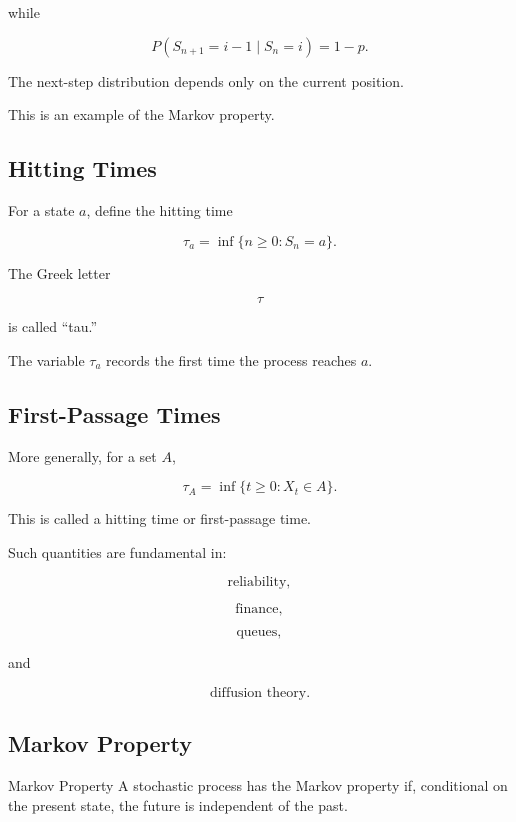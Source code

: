 while

\[
P(S_{n+1}=i-1\mid S_n=i)
=
1-p.
\]

The next-step distribution depends only on the current position.

This is an example of the Markov property.

\subsection{Hitting Times}
\label{subsec:hitting-times}

For a state \(a\), define the hitting time

\[
\boxed{
\tau_a
=
\inf
\{
n\geq0:S_n=a
\}.
}
\]

The Greek letter

\[
\tau
\]

is called ``tau.''

The variable \(\tau_a\) records the first time the process reaches
\(a\).

\subsection{First-Passage Times}
\label{subsec:first-passage-times}

More generally, for a set \(A\),

\[
\boxed{
\tau_A
=
\inf
\{
t\geq0:X_t\in A
\}.
}
\]

This is called a hitting time or first-passage time.

Such quantities are fundamental in:

\[
\text{reliability},
\]

\[
\text{finance},
\]

\[
\text{queues},
\]

and

\[
\text{diffusion theory}.
\]

\subsection{Markov Property}
\label{subsec:markov-property}

\begin{definitionbox}{Markov Property}
A stochastic process has the Markov property if, conditional on the
present state, the future is independent of the past.
\end{definitionbox}

